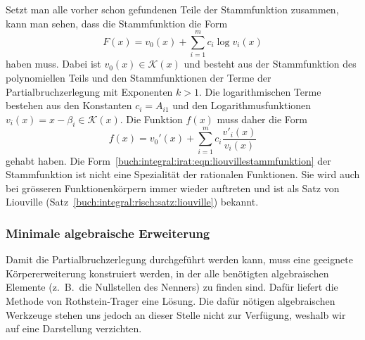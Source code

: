 Setzt man alle vorher schon gefundenen Teile der Stammfunktion zusammen,
kann man sehen, dass die Stammfunktion die Form
\begin{equation}
F(x) = v_0(x) + \sum_{i=1}^m c_i \log v_i(x)
\label{buch:integral:irat:eqn:liouvillestammfunktion}
\end{equation}
haben muss.
Dabei ist $v_0(x)\in\mathscr{K}(x)$ und besteht aus der Stammfunktion
des polynomiellen Teils und den Stammfunktionen der Terme der Partialbruchzerlegung mit Exponenten $k>1$.
Die logarithmischen Terme bestehen aus den Konstanten $c_i=A_{i1}$ 
und den Logarithmusfunktionen $v_i(x)=x-\beta_i\in\mathscr{K}(x)$.
Die Funktion $f(x)$ muss daher die Form
\begin{equation}
f(x)
=
v_0'(x)
+
\sum_{i=1}^m c_i\frac{v'_i(x)}{v_i(x)}
\label{buch:integral:irat:eqn:liouvillefunktion}
\end{equation}
gehabt haben.
Die Form~\eqref{buch:integral:irat:eqn:liouvillestammfunktion}
der Stammfunktion ist nicht eine Spezialität der rationalen Funktionen.
Sie wird auch bei grösseren Funktionenkörpern immer wieder auftreten
und ist als Satz von Liouville (Satz~\ref{buch:integral:risch:satz:liouville})
bekannt.

%
%
\subsubsection{Minimale algebraische Erweiterung}
Damit die Partialbruchzerlegung durchgeführt werden kann, muss
eine geeignete Körpererweiterung konstruiert werden, in der alle
benötigten algebraischen Elemente (z.~B.~die Nullstellen des Nenners)
zu finden sind.
Dafür liefert die Methode von Rothstein-Trager eine Lösung.
Die dafür nötigen algebraischen Werkzeuge stehen uns jedoch
an dieser Stelle nicht zur Verfügung, weshalb wir auf eine
Darstellung verzichten.



